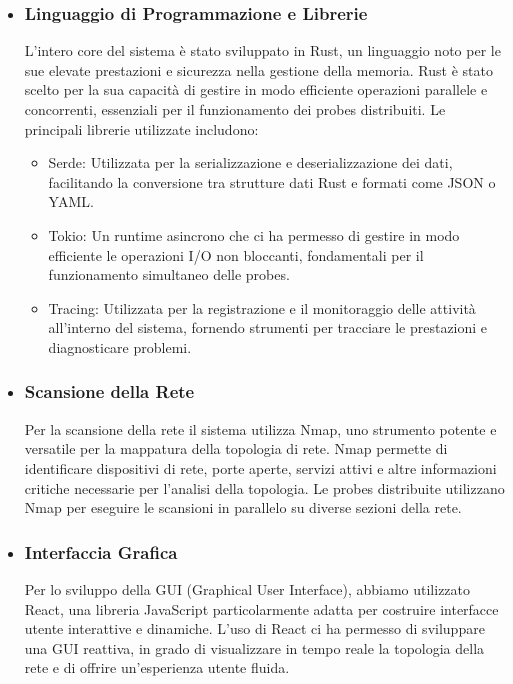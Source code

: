 \documentclass[target=bach,aauheader=,style=]{thud}
\begin{document}
\begin{itemize}

  \item \subsubsection{Linguaggio di Programmazione e Librerie}
    L'intero core del sistema è stato sviluppato in Rust, un linguaggio noto per le sue elevate prestazioni e sicurezza nella gestione della memoria. Rust è stato scelto per la sua capacità di gestire in modo efficiente operazioni parallele e concorrenti, essenziali per il funzionamento dei probes distribuiti. Le principali librerie utilizzate includono:
  \begin{itemize}
      \item[] Serde: Utilizzata per la serializzazione e deserializzazione dei dati, facilitando la conversione tra strutture dati Rust e formati come JSON o YAML.
      \item[] Tokio: Un runtime asincrono che ci ha permesso di gestire in modo efficiente le operazioni I/O non bloccanti, fondamentali per il funzionamento simultaneo delle probes.
      \item[] Tracing: Utilizzata per la registrazione e il monitoraggio delle attività all'interno del sistema, fornendo strumenti per tracciare le prestazioni e diagnosticare problemi.
  \end{itemize}

\item \subsubsection{Scansione della Rete}
  Per la scansione della rete il sistema utilizza Nmap, uno strumento potente e versatile per la mappatura della topologia di rete. Nmap permette di identificare dispositivi di rete, porte aperte, servizi attivi e altre informazioni critiche necessarie per l'analisi della topologia. Le probes distribuite utilizzano Nmap per eseguire le scansioni in parallelo su diverse sezioni della rete.

\item \subsubsection{Interfaccia Grafica}
  Per lo sviluppo della GUI (Graphical User Interface), abbiamo utilizzato React, una libreria JavaScript particolarmente adatta per costruire interfacce utente interattive e dinamiche. L'uso di React ci ha permesso di sviluppare una GUI reattiva, in grado di visualizzare in tempo reale la topologia della rete e di offrire un'esperienza utente fluida.


\end{itemize}
\end{document}
